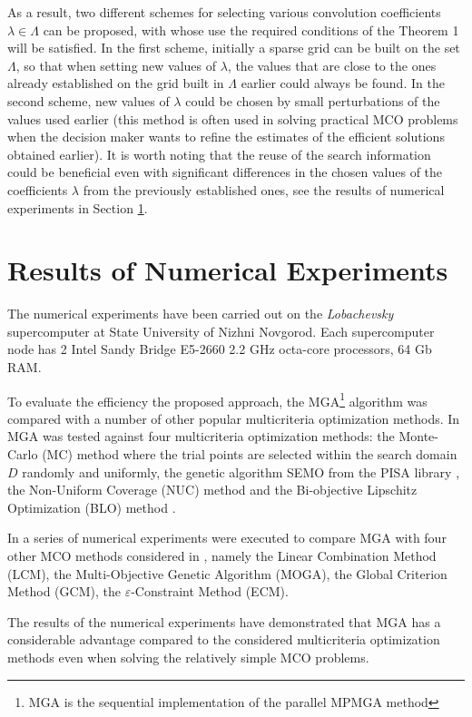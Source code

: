 As a result, two different schemes for selecting various convolution coefficients $\lambda \in \Lambda$ can be proposed, with whose use the required conditions of the Theorem 1 will be satisfied. In the first scheme, initially a sparse grid can be built on the set $\Lambda$, so that when setting new values of $\lambda$, the values that are close to the ones already established on the grid built in $\Lambda$ earlier could always be found. In the second scheme, new values of $\lambda$ could be chosen by small perturbations of the values used earlier (this method is often used in solving practical MCO problems when the decision maker wants to refine the estimates of the efficient solutions obtained earlier). It is worth noting that the reuse of the search information could be beneficial even with significant differences in the chosen values of the coefficients $\lambda$ from the previously established ones, see the results of numerical experiments in Section \ref{sec:4}.


\section{Results of Numerical Experiments}
\label{sec:4}

The numerical experiments have been carried out on the \textit{Lobachevsky} supercomputer at State University of Nizhni Novgorod. Each supercomputer node has 2 Intel Sandy Bridge E5-2660 2.2 GHz octa-core processors, 64 Gb RAM. 

To evaluate the efficiency the proposed approach, the MGA\footnote{MGA is the sequential implementation of the parallel MPMGA method} algorithm was compared with a number of other popular multicriteria optimization methods. In \cite{c20} MGA was tested against four multicriteria optimization methods: the Monte-Carlo (MC) method where the trial points are selected within the search domain $D$ randomly and uniformly, the genetic algorithm SEMO from the PISA library \cite{c21}, the Non-Uniform Coverage (NUC) method \cite{c17} and the Bi-objective Lipschitz Optimization (BLO) method \cite{c18}.

In \cite{c16} a series of numerical experiments were executed to compare MGA with four other MCO methods considered in \cite{c22}, namely the Linear Combination Method (LCM), the Multi-Objective Genetic Algorithm (MOGA), the Global Criterion Method (GCM), the $\varepsilon$-Constraint Method (ECM).

The results of the numerical experiments have demonstrated that MGA has a considerable advantage compared to the considered multicriteria optimization methods even when solving the relatively simple MCO problems.


